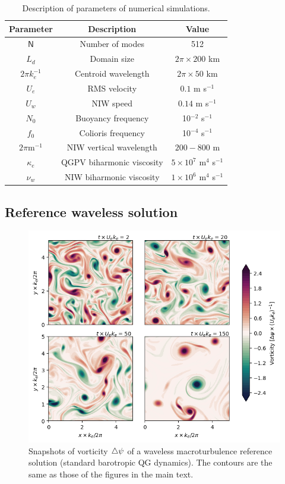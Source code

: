 \documentclass{jfm}
\begin{document}
\begin{table}
 \begin{center}
   \label{parameters_description}
   \caption{Description of parameters of numerical simulations.}
   \begin{tabular}{ c | c | c }
      Parameter & Description & Value \\ \hline
      $\mathsf{N}$   & Number of modes &  512 \\
      $L_d$ & Domain size & $2\pi\times 200$ km \\
      $2\pi k_e^{-1}$ & Centroid wavelength & $2\pi\times 50$ km \\
      $U_e$ & RMS velocity & $0.1$ m s$^{-1}$ \\
      $U_w$ & NIW speed & $ 0.14$ m s$^{-1}$ \\
      $N_0$ & Buoyancy frequency & 10$^{-2}$ s$^{-1}$\\
      $f_0$ & Colioris frequency & 10$^{-4}$ s$^{-1}$\\
      $2\pi$m$^{-1}$ & NIW vertical wavelength & $200 - 800$ m \\
      $\kappa_e$ & QGPV biharmonic viscosity & $5\times 10^{7}$ m$^4$ s$^{-1}$\\
      $\nu_w$ & NIW biharmonic viscosity & $ 1 \times 10^{6}$ m$^4$ s$^{-1}$\\
   \end{tabular}
 \end{center}
\end{table}

\subsection{Reference waveless solution}

\begin{figure}
\label{figc1}
\centering
\includegraphics[width=1.\textwidth]{figs/figc1.png}
\caption{Snapshots of vorticity $\triangle\psi$ of a waveless macroturbulence reference solution
          (standard barotropic QG dynamics). The contours are the same as those of the
          figures in the main text.}
\end{figure}
\end{document}
